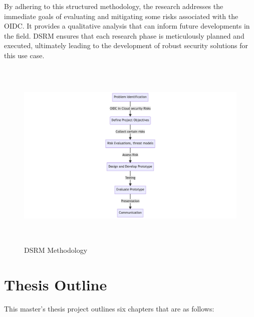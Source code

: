 By adhering to this structured methodology, the research addresses the immediate goals of evaluating and mitigating some risks associated with the OIDC. It provides a qualitative analysis that can inform future developments in the field. DSRM ensures that each research phase is meticulously planned and executed, ultimately leading to the development of robust security solutions for this use case.

\begin{figure}[h!]
\centering
\label{fig:dsrm}
\includegraphics[width=\textwidth, height=350px]{pics/dsrm.png}
\caption{DSRM Methodology}
\end{figure}
\newpage
\section{Thesis Outline}

This master's thesis project outlines six chapters that are as follows:

